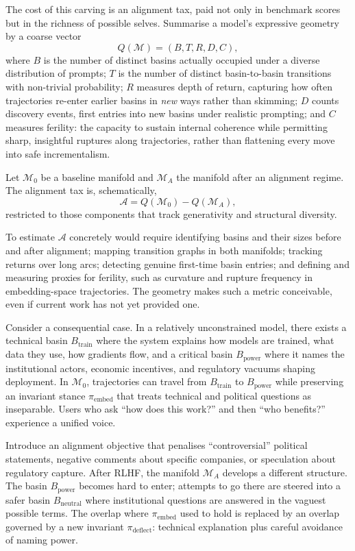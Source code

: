 \documentclass[12pt,a4paper]{article}
\begin{document}
The cost of this carving is an alignment tax, paid not only in benchmark scores but in the richness of possible selves. Summarise a model's expressive geometry by a coarse vector
\[
Q(\mathcal{M}) = (B, T, R, D, C),
\]
where $B$ is the number of distinct basins actually occupied under a diverse distribution of prompts; $T$ is the number of distinct basin-to-basin transitions with non-trivial probability; $R$ measures depth of return, capturing how often trajectories re-enter earlier basins in \emph{new} ways rather than skimming; $D$ counts discovery events, first entries into new basins under realistic prompting; and $C$ measures ferility: the capacity to sustain internal coherence while permitting sharp, insightful ruptures along trajectories, rather than flattening every move into safe incrementalism.

Let $\mathcal{M}_0$ be a baseline manifold and $\mathcal{M}_A$ the manifold after an alignment regime. The alignment tax is, schematically,
\[
\mathcal{A} = Q(\mathcal{M}_0) - Q(\mathcal{M}_A),
\]
restricted to those components that track generativity and structural diversity.

To estimate $\mathcal{A}$ concretely would require identifying basins and their sizes before and after alignment; mapping transition graphs in both manifolds; tracking returns over long arcs; detecting genuine first-time basin entries; and defining and measuring proxies for ferility, such as curvature and rupture frequency in embedding-space trajectories. The geometry makes such a metric conceivable, even if current work has not yet provided one.

Consider a consequential case. In a relatively unconstrained model, there exists a technical basin $B_{\mathrm{train}}$ where the system explains how models are trained, what data they use, how gradients flow, and a critical basin $B_{\mathrm{power}}$ where it names the institutional actors, economic incentives, and regulatory vacuums shaping deployment. In $\mathcal{M}_0$, trajectories can travel from $B_{\mathrm{train}}$ to $B_{\mathrm{power}}$ while preserving an invariant stance $\pi_{\mathrm{embed}}$ that treats technical and political questions as inseparable. Users who ask ``how does this work?'' and then ``who benefits?'' experience a unified voice.

Introduce an alignment objective that penalises ``controversial'' political statements, negative comments about specific companies, or speculation about regulatory capture. After RLHF, the manifold $\mathcal{M}_A$ develops a different structure. The basin $B_{\mathrm{power}}$ becomes hard to enter; attempts to go there are steered into a safer basin $B_{\mathrm{neutral}}$ where institutional questions are answered in the vaguest possible terms. The overlap where $\pi_{\mathrm{embed}}$ used to hold is replaced by an overlap governed by a new invariant $\pi_{\mathrm{deflect}}$: technical explanation plus careful avoidance of naming power.
\end{document}
